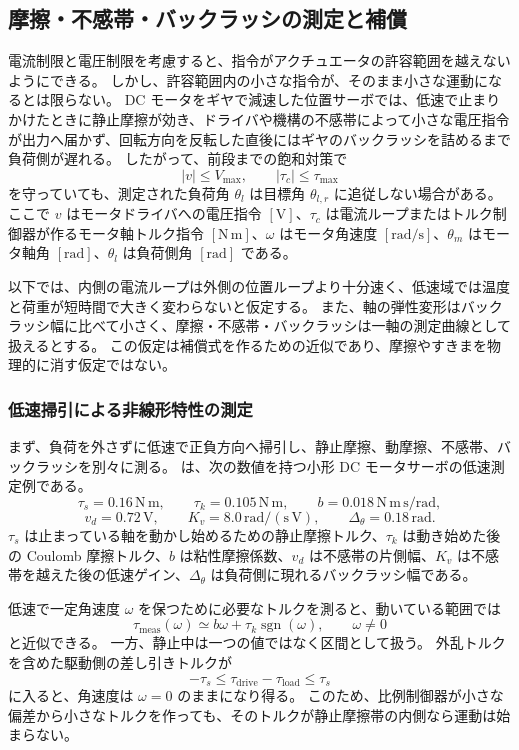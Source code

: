 \subsection{摩擦・不感帯・バックラッシの測定と補償}

電流制限と電圧制限を考慮すると、指令がアクチュエータの許容範囲を越えないようにできる。
しかし、許容範囲内の小さな指令が、そのまま小さな運動になるとは限らない。
DC モータをギヤで減速した位置サーボでは、低速で止まりかけたときに静止摩擦が効き、ドライバや機構の不感帯によって小さな電圧指令が出力へ届かず、回転方向を反転した直後にはギヤのバックラッシを詰めるまで負荷側が遅れる。
したがって、前段までの飽和対策で
\[
  |v|\leq V_{\max},\qquad |\tau_c|\leq \tau_{\max}
\]
を守っていても、測定された負荷角 $\theta_l$ は目標角 $\theta_{l,r}$ に追従しない場合がある。
ここで $v$ はモータドライバへの電圧指令 $[\mathrm{V}]$、$\tau_c$ は電流ループまたはトルク制御器が作るモータ軸トルク指令 $[\mathrm{N\,m}]$、$\omega$ はモータ角速度 $[\mathrm{rad/s}]$、$\theta_m$ はモータ軸角 $[\mathrm{rad}]$、$\theta_l$ は負荷側角 $[\mathrm{rad}]$ である。

以下では、内側の電流ループは外側の位置ループより十分速く、低速域では温度と荷重が短時間で大きく変わらないと仮定する。
また、軸の弾性変形はバックラッシ幅に比べて小さく、摩擦・不感帯・バックラッシは一軸の測定曲線として扱えるとする。
この仮定は補償式を作るための近似であり、摩擦やすきまを物理的に消す仮定ではない。

\subsubsection{低速掃引による非線形特性の測定}

まず、負荷を外さずに低速で正負方向へ掃引し、静止摩擦、動摩擦、不感帯、バックラッシを別々に測る。
 は、次の数値を持つ小形 DC モータサーボの低速測定例である。
\[
  \tau_s=0.16\,\mathrm{N\,m},\qquad
  \tau_k=0.105\,\mathrm{N\,m},\qquad
  b=0.018\,\mathrm{N\,m\,s/rad},
\]
\[
  v_d=0.72\,\mathrm{V},\qquad
  K_v=8.0\,\mathrm{rad/(s\,V)},\qquad
  \Delta_\theta=0.18\,\mathrm{rad}.
\]
$\tau_s$ は止まっている軸を動かし始めるための静止摩擦トルク、$\tau_k$ は動き始めた後の Coulomb 摩擦トルク、$b$ は粘性摩擦係数、$v_d$ は不感帯の片側幅、$K_v$ は不感帯を越えた後の低速ゲイン、$\Delta_\theta$ は負荷側に現れるバックラッシ幅である。

低速で一定角速度 $\omega$ を保つために必要なトルクを測ると、動いている範囲では
\[
  \tau_{\mathrm{meas}}(\omega)
  \simeq b\omega+\tau_k\operatorname{sgn}(\omega),
  \qquad \omega\neq 0
\]
と近似できる。
一方、静止中は一つの値ではなく区間として扱う。
外乱トルクを含めた駆動側の差し引きトルクが
\[
  -\tau_s \leq \tau_{\mathrm{drive}}-\tau_{\mathrm{load}}\leq \tau_s
\]
に入ると、角速度は $\omega=0$ のままになり得る。
このため、比例制御器が小さな偏差から小さなトルクを作っても、そのトルクが静止摩擦帯の内側なら運動は始まらない。

